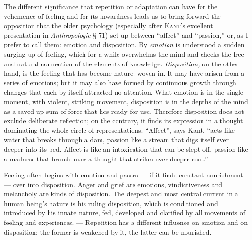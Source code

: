 \documentclass[12pt,a4paper,openany]{book}
\newcommand{\opage}[1]{\marginnote{\footnotesize\textit{[#1]}}}
\begin{document}
The different significance that repetition or adaptation can have for the vehemence of
feeling and for its inwardness leads us to bring forward the opposition that the older
psychology (especially after \textsc{Kant}'s excellent presentation in
\textit{Anthropologie} § 71) set up between ``affect'' and ``passion,'' or, as I prefer to
call them: emotion and disposition. By \textit{emotion} is understood a sudden surging up
of feeling, which for a while overwhelms the mind and checks the free and natural
connection of the elements of knowledge. \textit{Disposition,} on the other hand, is the
feeling that has become nature, woven in. It may have arisen from a series of emotions;
but it may also have formed by continuous growth through changes that each by itself
attracted no attention. What emotion is in the single moment, with violent, striking
movement, disposition is in the depths of the mind as a saved-up sum of force that lies
ready for use. Therefore disposition does not exclude deliberate reflection; on the
contrary, it finds its expression in a thought dominating the whole
\setcounter{footnote}{0}%
\opage{236}circle of representations. ``Affect'', says Kant, ``acts like water that breaks
through a dam, passion like a stream that digs itself ever deeper into its bed. Affect is
like an intoxication that can be slept off, passion like a madness that broods over a
thought that strikes ever deeper root.''

Feeling often begins with emotion and passes --- if it finds constant nourishment ---
over into disposition. Anger and grief are emotions, vindictiveness and melancholy are
kinds of disposition. The deepest and most central current in a human being's nature is
his ruling disposition, which is conditioned and introduced by his innate nature, fed,
developed and clarified by all movements of feeling and experiences. --- Repetition has a
different influence on emotion and on disposition: the former is weakened by it, the
latter can be nourished.
\end{document}
